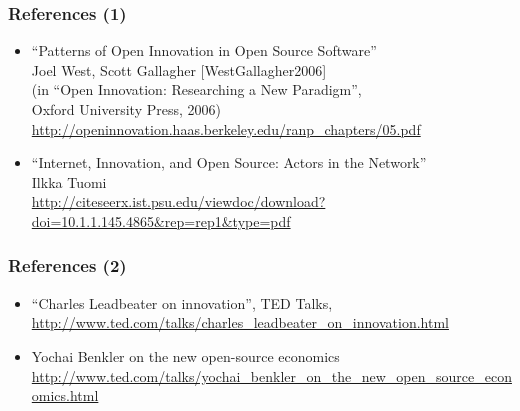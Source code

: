 
\begin{frame}
\frametitle{References (1)}

\begin{itemize}
\item
  ``Patterns of Open Innovation in Open Source Software'' \\
  Joel West, Scott Gallagher [WestGallagher2006] \\
  (in ``Open Innovation: Researching a New Paradigm'', \\
  Oxford University Press, 2006) \\
  {\small \url{http://openinnovation.haas.berkeley.edu/ranp_chapters/05.pdf}}
\item ``Internet, Innovation, and Open Source: Actors in the Network'' \\
  Ilkka Tuomi \\
  {\small \url{http://citeseerx.ist.psu.edu/viewdoc/download?doi=10.1.1.145.4865&rep=rep1&type=pdf}}
\end{itemize}

\end{frame}



\begin{frame}
\frametitle{References (2)}

\begin{itemize}
\item ``Charles Leadbeater on innovation'', TED Talks, \\
  {\small \url{http://www.ted.com/talks/charles_leadbeater_on_innovation.html}}
\item Yochai Benkler on the new open-source economics \\
  {\small \url{http://www.ted.com/talks/yochai_benkler_on_the_new_open_source_economics.html}}
\end{itemize}
\end{frame}

